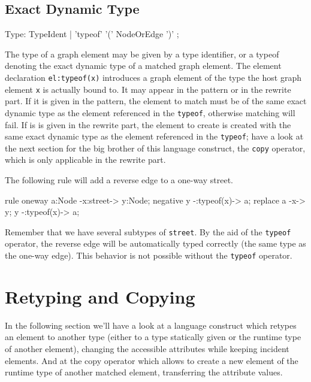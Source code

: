 \subsection{Exact Dynamic Type}\label{sec:typeof}

\begin{rail}
  Type: TypeIdent | 'typeof' '(' NodeOrEdge ')' ;
\end{rail}
The type of a graph element may be given by a type identifier,
or a typeof denoting the exact dynamic type of a matched graph element.
The element declaration \texttt{el:typeof(x)} introduces a graph element of the type the host graph element \texttt{x} is actually bound to.
It may appear in the pattern or in the rewrite part.
If it is given in the pattern, the element to match must be of the same exact dynamic type as the element referenced in the \texttt{typeof}, otherwise matching will fail.
If is is given in the rewrite part, the element to create is created with the same exact dynamic type as the element referenced in the \texttt{typeof}; have a look at the next section for the big brother of this language construct, the \texttt{copy} operator, which is only applicable in the rewrite part.

\begin{example}
The following rule will add a reverse edge to a one-way street.
\begin{grgen}
rule oneway {
    a:Node -x:street-> y:Node;
    negative {
        y -:typeof(x)-> a;
    }
    replace {
        a -x-> y;
        y -:typeof(x)-> a;
    }
}
\end{grgen}
Remember that we have several subtypes of \texttt{street}. By the aid of the \texttt{typeof} operator, the reverse edge will be automatically typed correctly (the same type as the one-way edge). This behavior is not possible without the \texttt{typeof} operator.
\end{example}


\section{Retyping and Copying}

In the following section we'll have a look at a language construct which retypes an element to another type
(either to a type statically given or the runtime type of another element),
changing the accessible attributes while keeping incident elements.
And at the copy operator which allows to create a new element of the runtime type of another matched element, transferring the attribute values.

